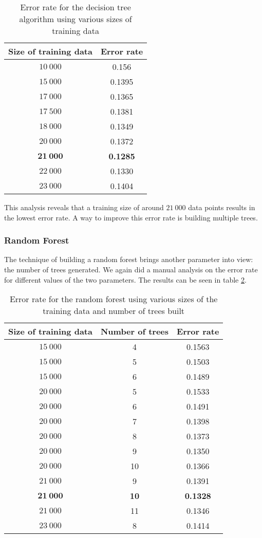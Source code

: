 \documentclass[10pt,a4paper]{article}
\begin{document}
\begin{table}[H]
\begin{tabular}{|c|c|}
\hline 
\textbf{Size of training data} & \textbf{Error rate} \\ 
\hline 
$10\ 000$ & 0.156 \\ 
\hline 
$15\ 000$ & 0.1395 \\ 
\hline 
$17\ 000$ & 0.1365 \\ 
\hline 
$17\ 500$ & 0.1381 \\ 
\hline 
$18\ 000$ & 0.1349 \\ 
\hline 
$20\ 000$ & 0.1372 \\ 
\hline 
$\mathbf{21\ 000}$ & \textbf{0.1285} \\ 
\hline 
$22\ 000$ & 0.1330 \\ 
\hline 
$23\ 000$ & 0.1404 \\ 
\hline 
\end{tabular} 
\caption{Error rate for the decision tree algorithm using various sizes of training data}
\label{decisiontree}
\end{table}
This analysis reveals that a training size of around $21\ 000$ data points results in the lowest error rate. A way to improve this error rate is building multiple trees.
\subsubsection{Random Forest}
The technique of building a random forest brings another parameter into view: the number of trees generated. We again did a manual analysis on the error rate for different values of the two parameters. The results can be seen in table \ref{randomforest}.

\begin{table}[H]
\begin{tabular}{|c|c|c|}
\hline 
\textbf{Size of training data} & \textbf{Number of trees} & \textbf{Error rate} \\ 
\hline 
$15\ 000$ & 4 & 0.1563 \\ 
\hline 
$15\ 000$ & 5 & 0.1503 \\ 
\hline 
$15\ 000$ & 6 & 0.1489 \\ 
\hline 
$20\ 000$ & 5 & 0.1533 \\ 
\hline 
$20\ 000$ & 6 & 0.1491 \\ 
\hline 
$20\ 000$ & 7 & 0.1398 \\ 
\hline 
$20\ 000$ & 8 & 0.1373 \\ 
\hline 
$20\ 000$ & 9 & 0.1350 \\ 
\hline 
$20\ 000$ & 10 & 0.1366 \\ 
\hline 
$21\ 000$ & 9 & 0.1391 \\ 
\hline 
$\mathbf{21\ 000}$ & \textbf{10} & \textbf{0.1328} \\ 
\hline 
$21\ 000$ & 11 & 0.1346 \\ 
\hline 
$23\ 000$ & 8 & 0.1414 \\ 
\hline 
\end{tabular} 
\caption{Error rate for the random forest using various sizes of the training data and number of trees built}
\label{randomforest}
\end{table}
\end{document}
